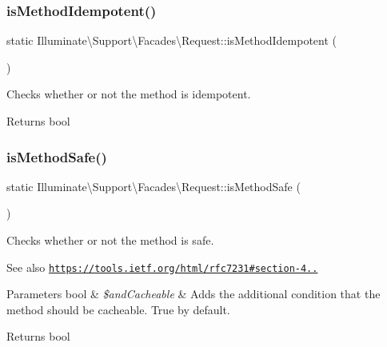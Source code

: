 \subsubsection{\texorpdfstring{is\+Method\+Idempotent()}{isMethodIdempotent()}}
{\footnotesize\ttfamily static Illuminate\textbackslash{}\+Support\textbackslash{}\+Facades\textbackslash{}\+Request\+::is\+Method\+Idempotent (\begin{DoxyParamCaption}{ }\end{DoxyParamCaption})\hspace{0.3cm}{\ttfamily [static]}}

Checks whether or not the method is idempotent.

\begin{DoxyReturn}{Returns}
bool 
\end{DoxyReturn}
\mbox{\label{class_illuminate_1_1_support_1_1_facades_1_1_request_ae5c61ec58eda5633dd221ae99b3521d3}} 
\subsubsection{\texorpdfstring{is\+Method\+Safe()}{isMethodSafe()}}
{\footnotesize\ttfamily static Illuminate\textbackslash{}\+Support\textbackslash{}\+Facades\textbackslash{}\+Request\+::is\+Method\+Safe (\begin{DoxyParamCaption}{ }\end{DoxyParamCaption})\hspace{0.3cm}{\ttfamily [static]}}

Checks whether or not the method is safe.

\begin{DoxySeeAlso}{See also}
\href{https://tools.ietf.org/html/rfc7231#section-4.2.1}{\tt https\+://tools.\+ietf.\+org/html/rfc7231\#section-\/4..} 
\end{DoxySeeAlso}

\begin{DoxyParams}[1]{Parameters}
bool & {\em \$and\+Cacheable} & Adds the additional condition that the method should be cacheable. True by default. \\
\hline
\end{DoxyParams}
\begin{DoxyReturn}{Returns}
bool 
\end{DoxyReturn}
\mbox{\label{class_illuminate_1_1_support_1_1_facades_1_1_request_a336ff9cf1ed0222ac38432f1f0ac952f}} 
